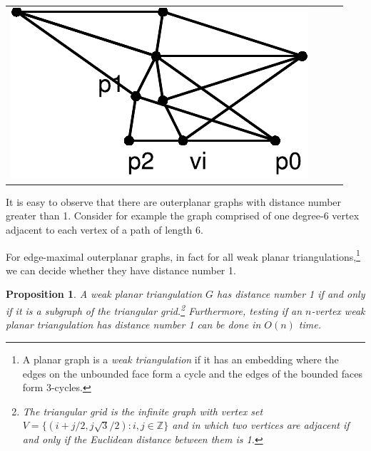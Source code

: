 \documentclass{article}
\newtheorem{prop}{Proposition}
\begin{document}
{\begin{tabular}{cccc}
\includegraphics[scale=.30]{no2-4} 
\end{tabular}

It is easy to observe that there are outerplanar graphs with distance
number greater than 1.  Consider for example the graph comprised of
one degree-6 vertex adjacent to each vertex of a path of length 6. 
}

For edge-maximal outerplanar graphs, in fact for all weak planar
triangulations,\footnote{A planar graph is a \emph{weak triangulation}
if it has an embedding where the edges on the unbounded face form a
cycle and the edges of the bounded faces form 3-cycles.} we can decide
whether they have distance number 1.

\begin{prop} 
A weak planar triangulation $G$ has distance number 1 if and only if
it is a subgraph of the triangular grid.\footnote{The triangular grid
is the infinite graph with vertex set $V=\{(i+j/2,j\sqrt{3}/2):
i,j\in\mathbb{Z}\}$ and in which two vertices are adjacent if and only
if the Euclidean distance between them is 1.\label{fna}}  Furthermore,
testing if an $n$-vertex weak planar triangulation has distance number
1 can be done in $O(n)$ time.  
\end{prop}
\end{document}
